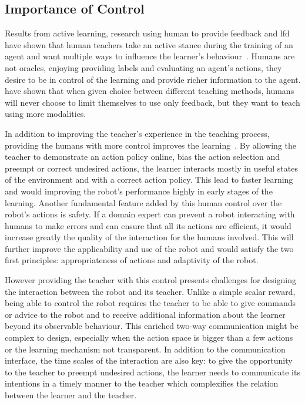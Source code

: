 \subsection{Importance of Control}

Results from active learning, research using human to provide feedback and \gls{lfd} have shown that human teachers take an active stance during the training of an agent and want multiple ways to influence the learner's behaviour~\citep{amershi2014power}. Humans are not oracles, enjoying providing labels and evaluating an agent's actions, they desire to be in control of the learning and provide richer information to the agent. \cite{kaochar2011towards} have shown that when given choice between different teaching methods, humans will never choose to limit themselves to use only feedback, but they want to teach using more modalities.

In addition to improving the teacher's experience in the teaching process, providing the humans with more control improves the learning~\citep{thomaz2008teachable,chernova2009interactive}. By allowing the teacher to demonstrate an action policy online, bias the action selection and preempt or correct undesired actions, the learner interacts mostly in useful states of the environment and with a correct action policy. This lead to faster learning and would improving the robot's performance highly in early stages of the learning. Another fundamental feature added by this human control over the robot's actions is safety. If a domain expert can prevent a robot interacting with humans to make errors and can ensure that all its actions are efficient, it would increase greatly the quality of the interaction for the humans involved. This will further improve the applicability and use of the robot and would satisfy the two first principles: appropriateness of actions and adaptivity of the robot.

However providing the teacher with this control presents challenges for designing the interaction between the robot and its teacher. Unlike a simple scalar reward, being able to control the robot requires the teacher to be able to give commands or advice to the robot and to receive additional information about the learner beyond its observable behaviour. This enriched two-way communication might be complex to design, especially when the action space is bigger than a few actions or the learning mechanism not transparent. In addition to the communication interface, the time scales of the interaction are also key: to give the opportunity to the teacher to preempt undesired actions, the learner needs to communicate its intentions in a timely manner to the teacher which complexifies the relation between the learner and the teacher. %

